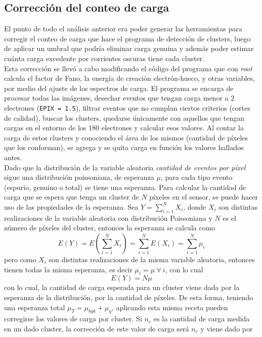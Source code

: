 \subsection{Corrección del conteo de carga}
\noindent El punto de todo el análisis anterior era poder generar las herramientas para corregir el conteo de carga que hace el programa de detección de clusters, luego de aplicar un umbral que podría eliminar carga genuina y además poder estimar cuánta carga excedente por corrientes oscuras tiene cada cluster.\\
\indent Esta corrección se llevó a cabo modificando el código del programa que con \textit{root} calcula el factor de Fano, la energía de creación electrón-hueco, y otras variables, por medio del ajuste de los espectros de carga. El programa se encarga de procesar todas las imágenes, desechar eventos que tengan carga menor a $2$ electrones (\verb|EPIX = 1.5|), filtrar eventos que no cumplan ciertos criterios (cortes de calidad), buscar los clusters, quedarse únicamente con aquellos que tengan cargas en el entorno de los $180$ electrones y calcular esos valores. Al contar la carga de estos clusters y conociendo el área de los mismos (cantidad de píxeles que los conforman), se agrega y se quita carga en función los valores hallados antes.\\
\indent Dado que la distribución de la variable aleatoria \textit{cantidad de eventos por píxel} sigue una distribución poissoniana, de esperanza $\mu$, para cada tipo evento (espurio, genuino o total) se tiene una esperanza. Para calcular la cantidad de carga que se espera que tenga un cluster de $N$ píxeles en el sensor, se puede hacer uso de las propiedades de la esperanza. Sea $Y = \sum\limits_{i = 1}^{N} X_{i}$, donde $X_{i}$ son distintas realizaciones de la variable aleatoria con distribución Poissoniana y $N$ es el número de píxeles del cluster, entonces la esperanza se calcula como
\begin{equation*}
    E(Y) = 
    E
    \left(
        \sum\limits_{i=1}^{N} X_{i}
    \right)
    = \sum\limits_{i=1}^{N}E(X_{i})
    = \sum\limits_{i=1}^{N}\mu_{i}
\end{equation*}
pero como $X_{i}$ son distintas realizaciones de la misma variable aleatoria, entonces tienen todas la misma esperanza, es decir $\mu_{i} = \mu\ \forall\ i$, con lo cual
\begin{equation*}
    E(Y) = N\mu
\end{equation*}
con lo cual, la cantidad de carga esperada para un cluster viene dada por la esperanza de la distribución, por la cantidad de píxeles. De esta forma, teniendo una esperanza total $\mu_{T} = \mu_{bgk} + \mu_{g}$, aplicando esta misma receta pueden corregirse los valores de carga por cluster. Si $n_{e}$ es la cantidad de carga medida en un dado cluster, la corrección de este valor de carga será $n_{c}$ y viene dado por
